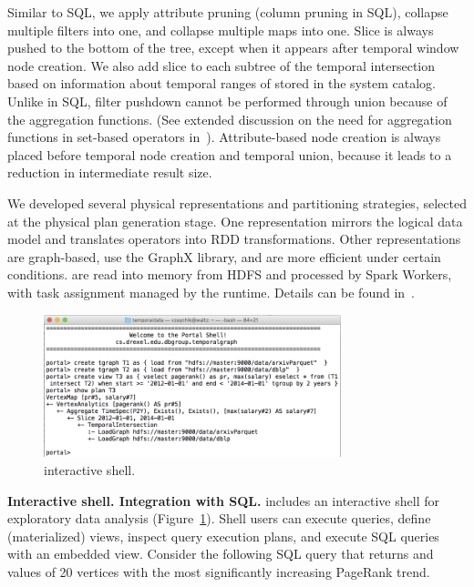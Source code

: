 Similar to SQL, we apply attribute pruning (column pruning in SQL),
collapse multiple filters into one, and collapse multiple maps into
one.  Slice is always pushed to the bottom of the tree, except when it
appears after temporal window node creation.  We also add slice to
each subtree of the temporal intersection based on information about
temporal ranges of \tgs stored in the system catalog.  Unlike in SQL, filter pushdown
cannot be performed through union because of the aggregation functions.
(See extended discussion on the need for aggregation functions in
set-based operators in~\cite{PortalarXiv2016}).  Attribute-based node
creation is always placed before temporal node creation and temporal
union, because it leads to a reduction in intermediate result size.

We developed several physical representations and partitioning
strategies, selected at the physical plan generation stage.  One
representation mirrors the logical data model and translates \tga
operators into RDD transformations.  Other representations are
graph-based, use the GraphX library, and are more efficient under
certain conditions.  \tgs are read into memory from HDFS and processed
by Spark Workers, with task assignment managed by the runtime.
Details can be found in~\cite{PortalarXiv2016}.

\begin{figure}[t]
\centering
\includegraphics[width=3.4in]{figs/shell.png}
\vspace{-0.5cm}
\caption{\sys interactive shell.}
\vspace{-0.5cm}
\label{fig:shell}
\end{figure}

{\bf Interactive shell. Integration with SQL.}  \sys includes an
interactive shell for exploratory data analysis
(Figure~\ref{fig:shell}). Shell users can execute queries, define
(materialized) views, inspect query execution plans, and execute SQL
queries with an embedded \ql view. Consider the following SQL query
that returns  and  values of 20 vertices with the
most significantly increasing PageRank trend.

